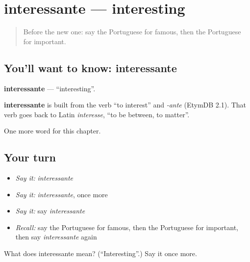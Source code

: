 \section[interessante]{interessante — interesting}

\label{lesson:PT-C123-interessante}



\begin{quote}
Before the new one: say the Portuguese for famous, then the Portuguese for important.
\end{quote}

\subsection*{You'll want to know: interessante}
\textbf{interessante} — \textquotedblleft{}interesting\textquotedblright{}.

\begin{cousinweb}
\textbf{interessante} is built from the verb \textquotedblleft{}to interest\textquotedblright{} and \emph{-ante} (EtymDB 2.1). That verb goes back to Latin \emph{interesse}, \textquotedblleft{}to be between, to matter\textquotedblright{}.
\end{cousinweb}

\begin{grammarlens}[title={What you've built}]
One more word for this chapter.
\end{grammarlens}

\subsection*{Your turn}
\begin{itemize}
\raggedright
  \item \emph{Say it:} \emph{interessante}
  \item \emph{Say it:} \emph{interessante}, once more
  \item \emph{Say it:} say \emph{interessante}
  \item \emph{Recall:} say the Portuguese for famous, then the Portuguese for important, then say \emph{interessante} again
\end{itemize}

\begin{tcolorbox}[breakable,colback=teal!4,colframe=teal!35!black,title={Before you move on}]
What does interessante mean? (\textquotedblleft{}Interesting\textquotedblright{}.) Say it once more.
\end{tcolorbox}
